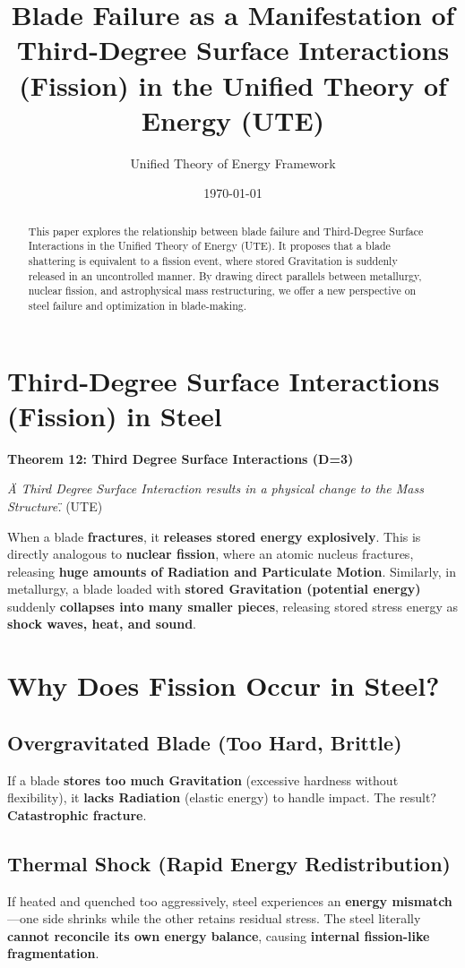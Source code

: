 \documentclass{article}
\title{Blade Failure as a Manifestation of Third-Degree Surface Interactions (Fission) in the Unified Theory of Energy (UTE)}
\author{Unified Theory of Energy Framework}
\date{\today}
\begin{document}
\maketitle

\begin{abstract}
This paper explores the relationship between blade failure and Third-Degree Surface Interactions in the Unified Theory of Energy (UTE). It proposes that a blade shattering is equivalent to a fission event, where stored Gravitation is suddenly released in an uncontrolled manner. By drawing direct parallels between metallurgy, nuclear fission, and astrophysical mass restructuring, we offer a new perspective on steel failure and optimization in blade-making.
\end{abstract}

\section{Third-Degree Surface Interactions (Fission) in Steel}
\textbf{Theorem 12: Third Degree Surface Interactions (D=3)}

\textit{\"A Third Degree Surface Interaction results in a physical change to the Mass Structure.\"} (UTE)

When a blade \textbf{fractures}, it \textbf{releases stored energy explosively}. This is directly analogous to \textbf{nuclear fission}, where an atomic nucleus fractures, releasing \textbf{huge amounts of Radiation and Particulate Motion}. Similarly, in metallurgy, a blade loaded with \textbf{stored Gravitation (potential energy)} suddenly \textbf{collapses into many smaller pieces}, releasing stored stress energy as \textbf{shock waves, heat, and sound}.

\section{Why Does Fission Occur in Steel?}
\subsection{Overgravitated Blade (Too Hard, Brittle)}
If a blade \textbf{stores too much Gravitation} (excessive hardness without flexibility), it \textbf{lacks Radiation} (elastic energy) to handle impact. The result? \textbf{Catastrophic fracture}.

\subsection{Thermal Shock (Rapid Energy Redistribution)}
If heated and quenched too aggressively, steel experiences an \textbf{energy mismatch}—one side shrinks while the other retains residual stress. The steel literally \textbf{cannot reconcile its own energy balance}, causing \textbf{internal fission-like fragmentation}.
\end{document}
